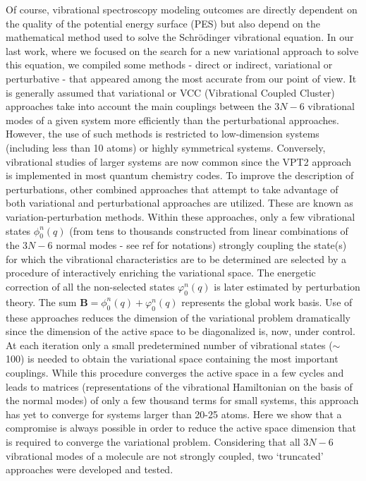 	Of course, vibrational spectroscopy modeling outcomes are directly dependent on the quality of the potential energy surface (PES) but also depend on the mathematical method used to solve the Schrödinger vibrational equation. In our last work,\cite{garnier2016adaptive} where we focused on the search for a new variational approach to solve this equation, we compiled some methods - direct or indirect, variational or perturbative - that appeared among the most accurate from our point of view. It is generally assumed that variational or VCC (Vibrational Coupled Cluster) approaches take into account the main couplings between the $3N - 6$ vibrational modes of a given system more efficiently than the perturbational approaches. However, the use of such methods is restricted to low-dimension systems (including less than 10 atoms) or highly symmetrical systems. Conversely, vibrational studies of larger systems are now common since the VPT2 approach is implemented in most quantum chemistry codes. To improve the description of perturbations, other combined approaches that attempt to take advantage of both variational and perturbational approaches are utilized. These are known as variation-perturbation methods. Within these approaches, only a few vibrational states $\phi_0^n (q)$ (from tens to thousands constructed from linear combinations of the $3N - 6$ normal modes - see ref\cite{garnier2016adaptive} for notations) strongly coupling the state(s) for which the vibrational characteristics are to be determined are selected by a procedure of interactively enriching the variational space. The energetic correction of all the non-selected states $\varphi_0^n (q)$ is later estimated by perturbation theory. The sum $\textbf{B} = \phi_0^n (q) + \varphi_0^n (q)$ represents the global work basis. Use of these approaches reduces the dimension of the variational problem dramatically\cite{baraille2001calculation,scribano2008iterative} since the dimension of the active space to be diagonalized is, now, under control. At each iteration only a small predetermined number of vibrational states ($\sim$ 100) is needed to obtain the variational space containing the most important couplings. While this procedure converges the active space in a few cycles and leads to matrices (representations of the vibrational Hamiltonian on the basis of the normal modes) of only a few thousand terms for small systems, this approach has yet to converge for systems larger than 20-25 atoms. Here we show that a compromise is always possible in order to reduce the active space dimension that is required to converge the variational problem. Considering that all $3N-6$ vibrational modes of a molecule are not strongly coupled, two ‘truncated’ approaches were developed and tested.\\
	
